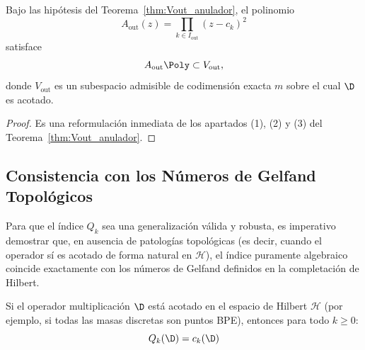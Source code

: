 \begin{cor}
	\label{cor:anulador_canonico_umbral}
	Bajo las hipótesis del Teorema~\ref{thm:Vout_anulador}, el polinomio
	\[
		A_{\mathrm{out}}(z)=\prod_{k\in I_{\mathrm{out}}}(z-c_k)^2
	\]
	satisface
	\[
		A_{\mathrm{out}}\Poly\subset V_{\mathrm{out}},
	\]
	donde $V_{\mathrm{out}}$ es un subespacio admisible de codimensión exacta $m$
	sobre el cual $\D$ es acotado.
\end{cor}

\begin{proof}
	Es una reformulación inmediata de los apartados (1), (2) y (3) del
	Teorema~\ref{thm:Vout_anulador}.
\end{proof}



\subsection{Consistencia con los Números de Gelfand Topológicos}

Para que el índice $Q_k$ sea una generalización válida y robusta, es imperativo demostrar que, en ausencia de patologías topológicas (es decir, cuando el operador sí es acotado de forma natural en $\mathcal{H}$), el índice puramente algebraico coincide exactamente con los números de Gelfand definidos en la completación de Hilbert.

\begin{thm}\label{thm:equivalencia_Qk_Gelfand}
	Si el operador multiplicación $\D$ está acotado en el espacio de Hilbert $\mathcal{H}$ (por ejemplo, si todas las masas discretas son puntos BPE), entonces para todo $k \ge 0$:
	$$ Q_k(\D) = c_k(\D) $$
\end{thm}

